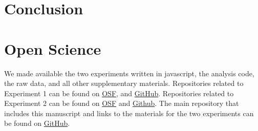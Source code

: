 \documentclass[10pt,letterpaper]{article}
\begin{document}
\section{Conclusion}

\section{Open Science}

We made available the two experiments written in javascript, the analysis code, the raw data, and all other supplementary materials.
Repositories related to Experiment 1 can be found on \href{https://osf.io/auwvt/?view_only=2dc8384074fa4bcf9f2e3937fdaee2b4}{OSF}, and \href{https://github.com/lenarddome/ply216-observational-ibre}{GitHub}.
Repositories related to Experiment 2 can be found on \href{https://osf.io/2tmc4/?view_only=489ebc888ef84a6b9b904072cfbe74df}{OSF} and \href{https://github.com/lenarddome/ply222-non-causal-ibre}{Github}.
The main repository that includes this manuscript and links to the materials for the two experiments can be found on \href{https://github.com/lenarddome/pu093-errorless-attentionless-ibre}{GitHub}.



\setlength{\bibleftmargin}{.125in}
\setlength{\bibindent}{-\bibleftmargin}


\end{document}
